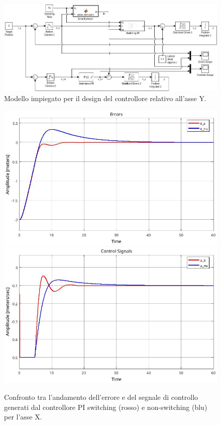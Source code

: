 \begin{figure}
    \centering
    \includegraphics[width=\textwidth]{figs/chapter4/compmodel.jpg}
    \caption{Modello impiegato per il design del controllore relativo all'asse Y.}
    \label{fig:compmodel}
\end{figure}

\begin{figure}
    \centering
    \includegraphics[width=\textwidth]{figs/chapter4/xerrcomp.jpg}
    \vspace{0.2cm}
    \includegraphics[width=\textwidth]{figs/chapter4/xcontrolcomp.jpg}
    \caption{Confronto tra l'andamento dell'errore e del segnale di controllo generati dal controllore PI switching (rosso) e non-switching (blu) per l'asse X.}
    \label{fig:xcomp}
\end{figure}

